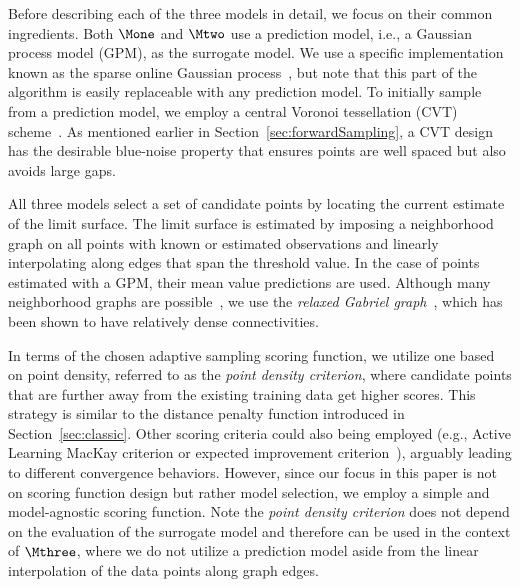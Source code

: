 Before describing each of the three models in detail, we focus on their common ingredients.
%
%
Both $\Mone$ and $\Mtwo$ use a prediction model, i.e., a Gaussian process model (GPM), as the surrogate model.
%
We use a specific implementation known as the sparse online Gaussian process~\cite{CsatoOpper2002}, but note that this part of the algorithm is easily replaceable with any prediction model.
%
To initially sample from a prediction model, we employ a central Voronoi tessellation (CVT)
scheme~\cite{DuFaberGunzburger1999}.
%
As mentioned earlier in Section~\ref{sec:forwardSampling}, a CVT design has the desirable blue-noise property that ensures points are well spaced but also avoids large gaps.

All three models select a set of candidate points by locating the current estimate of the limit surface.
%
The limit surface is estimated by imposing a neighborhood graph on all points with known or estimated observations and linearly interpolating along edges that span the threshold value.
%
In the case of points estimated with a GPM, their mean value predictions are used.
%
Although many neighborhood graphs are possible~\cite{CorreaLindstrom2011,MaljovecSahaLindstrom2013}, we use the \emph{relaxed Gabriel graph}~\cite{BoseCardinalCollette2009}, which has been shown to have relatively dense connectivities.

In terms of the chosen adaptive sampling scoring function, we utilize one based on point density, referred to as the \emph{point density criterion}, where candidate points that are further away from the existing training data get higher scores.
%
This strategy is similar to the distance penalty function introduced in Section~\ref{sec:classic}.
%
Other scoring criteria could also being employed (e.g., Active Learning MacKay criterion \cite{MacKay1992} or expected improvement criterion~\cite{Lam2008,JonesSchonlauWelch1998,Schonlau1997}), arguably leading to different convergence behaviors.
%
However, since our focus in this paper is not on scoring function design but rather model selection, we employ a simple and model-agnostic scoring function.
%
Note the \emph{point density criterion} does not depend on the evaluation of the surrogate model and therefore can be used in the context of $\Mthree$, where we do not utilize a prediction model aside from the linear interpolation of the data points along graph edges.

